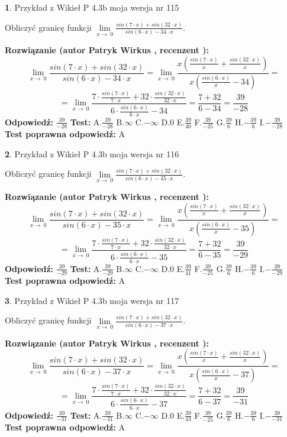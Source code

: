 \documentclass[12pt, a4paper]{article}
\theoremstyle{definition} %
\newtheorem{zad}{}
\newcommand{\zadStart}[1]{\begin{zad}#1\newline}
\newcommand{\zadStop}{\end{zad}}
\newcommand{\rozwStart}[2]{\noindent \textbf{Rozwiązanie (autor #1 , recenzent #2): }\newline}
\newcommand{\rozwStop}{\newline}
\newcommand{\odpStart}{\noindent \textbf{Odpowiedź:}\newline}
\newcommand{\odpStop}{\newline}
\newcommand{\testStart}{\noindent \textbf{Test:}\newline}
\newcommand{\testStop}{\newline}
\newcommand{\kluczStart}{\noindent \textbf{Test poprawna odpowiedź:}\newline}
\newcommand{\kluczStop}{\newline}
\begin{document}
\zadStart{Przykład z Wikieł P 4.3b moja wersja nr 115}


Obliczyć granicę funkcji $\lim\limits_{x\to\ 0}\frac{sin(7 \cdot x)+sin(32 \cdot x)}{sin(6 \cdot x)-34 \cdot x}$.
\zadStop
\rozwStart{Patryk Wirkus}{}
$$\lim\limits_{x\to\ 0}\frac{sin(7 \cdot x)+sin(32 \cdot x)}{sin(6 \cdot x)-34 \cdot x}=\lim\limits_{x\to\ 0}\frac{x(\frac{sin(7 \cdot x)}{x}+\frac{sin(32 \cdot x)}{x})}{x(\frac{sin(6 \cdot x)}{x}-34)}=$$
$$=\lim\limits_{x\to\ 0}\frac{7 \cdot \frac{sin(7 \cdot x)}{7 \cdot x}+32 \cdot \frac{sin(32 \cdot x)}{32 \cdot x}}{6 \cdot \frac{sin(6 \cdot x)}{6 \cdot x}-34}=\frac{7+32}{6-34} = \frac{39}{-28}$$
\rozwStop
\odpStart
$\frac{39}{-28}$
\odpStop
\testStart
A.$\frac{39}{-28}$
B.$\infty$
C.$-\infty$
D.$0$
E.$\frac{39}{40}$
F.$\frac{39}{-25}$
G.$\frac{39}{6}$
H.$-\frac{39}{6}$
I.$-\frac{39}{-28}$
\testStop
\kluczStart
A
\kluczStop



\zadStart{Przykład z Wikieł P 4.3b moja wersja nr 116}


Obliczyć granicę funkcji $\lim\limits_{x\to\ 0}\frac{sin(7 \cdot x)+sin(32 \cdot x)}{sin(6 \cdot x)-35 \cdot x}$.
\zadStop
\rozwStart{Patryk Wirkus}{}
$$\lim\limits_{x\to\ 0}\frac{sin(7 \cdot x)+sin(32 \cdot x)}{sin(6 \cdot x)-35 \cdot x}=\lim\limits_{x\to\ 0}\frac{x(\frac{sin(7 \cdot x)}{x}+\frac{sin(32 \cdot x)}{x})}{x(\frac{sin(6 \cdot x)}{x}-35)}=$$
$$=\lim\limits_{x\to\ 0}\frac{7 \cdot \frac{sin(7 \cdot x)}{7 \cdot x}+32 \cdot \frac{sin(32 \cdot x)}{32 \cdot x}}{6 \cdot \frac{sin(6 \cdot x)}{6 \cdot x}-35}=\frac{7+32}{6-35} = \frac{39}{-29}$$
\rozwStop
\odpStart
$\frac{39}{-29}$
\odpStop
\testStart
A.$\frac{39}{-29}$
B.$\infty$
C.$-\infty$
D.$0$
E.$\frac{39}{41}$
F.$\frac{39}{-25}$
G.$\frac{39}{6}$
H.$-\frac{39}{6}$
I.$-\frac{39}{-29}$
\testStop
\kluczStart
A
\kluczStop



\zadStart{Przykład z Wikieł P 4.3b moja wersja nr 117}


Obliczyć granicę funkcji $\lim\limits_{x\to\ 0}\frac{sin(7 \cdot x)+sin(32 \cdot x)}{sin(6 \cdot x)-37 \cdot x}$.
\zadStop
\rozwStart{Patryk Wirkus}{}
$$\lim\limits_{x\to\ 0}\frac{sin(7 \cdot x)+sin(32 \cdot x)}{sin(6 \cdot x)-37 \cdot x}=\lim\limits_{x\to\ 0}\frac{x(\frac{sin(7 \cdot x)}{x}+\frac{sin(32 \cdot x)}{x})}{x(\frac{sin(6 \cdot x)}{x}-37)}=$$
$$=\lim\limits_{x\to\ 0}\frac{7 \cdot \frac{sin(7 \cdot x)}{7 \cdot x}+32 \cdot \frac{sin(32 \cdot x)}{32 \cdot x}}{6 \cdot \frac{sin(6 \cdot x)}{6 \cdot x}-37}=\frac{7+32}{6-37} = \frac{39}{-31}$$
\rozwStop
\odpStart
$\frac{39}{-31}$
\odpStop
\testStart
A.$\frac{39}{-31}$
B.$\infty$
C.$-\infty$
D.$0$
E.$\frac{39}{43}$
F.$\frac{39}{-25}$
G.$\frac{39}{6}$
H.$-\frac{39}{6}$
I.$-\frac{39}{-31}$
\testStop
\kluczStart
A
\kluczStop
\end{document}
